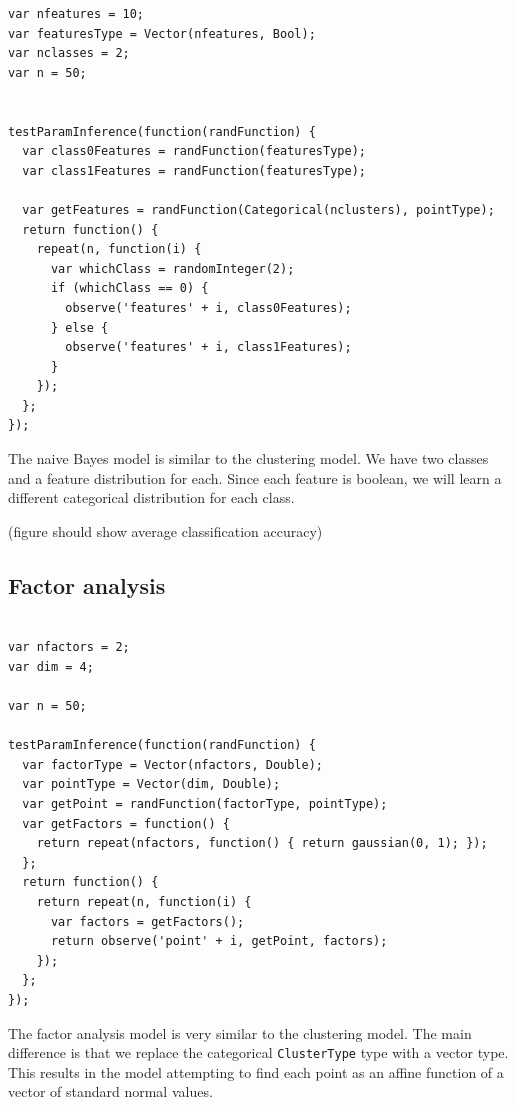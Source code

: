 \documentclass{article}
\begin{document}
{\small
\begin{verbatim}
var nfeatures = 10;
var featuresType = Vector(nfeatures, Bool);
var nclasses = 2;
var n = 50;


testParamInference(function(randFunction) {
  var class0Features = randFunction(featuresType);
  var class1Features = randFunction(featuresType);

  var getFeatures = randFunction(Categorical(nclusters), pointType);
  return function() {
    repeat(n, function(i) {
      var whichClass = randomInteger(2);
      if (whichClass == 0) {
        observe('features' + i, class0Features);
      } else {
        observe('features' + i, class1Features);
      }
    });
  };
});
\end{verbatim}
}

The naive Bayes model is similar to the clustering model.  We have two classes and a feature
distribution for each.  Since each feature is boolean, we will learn
a different categorical distribution for each class.

(figure should show average classification accuracy)

  \subsection{Factor analysis}
{\small
\begin{verbatim}

var nfactors = 2;
var dim = 4;

var n = 50;

testParamInference(function(randFunction) {
  var factorType = Vector(nfactors, Double);
  var pointType = Vector(dim, Double);
  var getPoint = randFunction(factorType, pointType);
  var getFactors = function() {
    return repeat(nfactors, function() { return gaussian(0, 1); });
  };
  return function() {
    return repeat(n, function(i) {
      var factors = getFactors();
      return observe('point' + i, getPoint, factors);
    });
  };
});
\end{verbatim}
}

The factor analysis model is very similar to the clustering model.  The main difference is that we replace the categorical \texttt{ClusterType} type with a vector type.  This results in the model attempting to find each point as an affine function of a vector of standard normal values.
\end{document}

